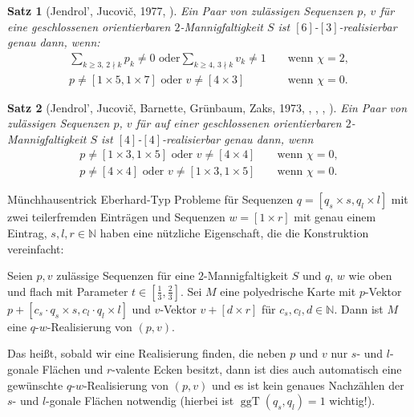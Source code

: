 \documentclass[10pt, notheorems]{beamer}
\newtheorem{theorem}{Satz}[section]
\newcommand{\nats}{\mathbb{N}}
\renewcommand{\gcd}{\operatorname{ggT}}
\begin{document}
\begin{frame}
  \begin{theorem}[{\sc Jendrol', Jucovi{\v{c}}}, 1977, \cite{jendrol1977generalization}] \label{thm:eberhard:extended:3}
    Ein Paar von zulässigen Sequenzen $p$, $v$ für eine geschlossenen orientierbaren $2$-Mannigfaltigkeit $S$ ist $[6]$-$[3]$-realisierbar genau dann, wenn:
    \begin{align*}
      \sum_{k \geq 3,\,2 \nmid k} p_k \neq 0 \text{ oder} \sum_{k \geq 4,\,3 \nmid k} v_k \neq 1& &\text{ wenn } \chi = 2, \\
      p \neq [1 \times 5, 1 \times 7] \text{ oder } v \neq [4 \times 3]& &\text{ wenn } \chi = 0.
    \end{align*}
  \end{theorem}
  \pause
  \begin{theorem}[{\sc Jendrol', Jucovi{\v{c}}, Barnette, Grünbaum, Zaks}, 1973, \cite{jucovivc1973theorem}, \cite{barnette1971toroidal}, \cite{grunbaum1969planar}, \cite{zaks1971analogue}] \label{thm:eberhard:extended:4}
    Ein Paar von zulässigen Sequenzen $p$, $v$ für auf einer geschlossenen orientierbaren $2$-Mannigfaltigkeit $S$ ist $[4]$-$[4]$-realisierbar genau dann, wenn
    \begin{align*}
      p \neq [1 \times 3, 1 \times 5] \text{ oder } v \neq [4 \times 4]& &\text{ wenn } \chi = 0,\\
      p \neq [4 \times 4] \text{ oder } v \neq [1 \times 3, 1 \times 5]& &\text{ wenn } \chi = 0.
    \end{align*}
  \end{theorem}
\end{frame}


\begin{frame}{Münchhausentrick}{}
  {\sc Eberhard}-Typ Probleme für Sequenzen $q = [q_s \times s, q_l \times l]$ mit zwei teilerfremden Einträgen und Sequenzen $w = [1 \times r]$ mit genau einem Eintrag, $s, l, r \in \nats$ haben eine nützliche Eigenschaft, die die Konstruktion vereinfacht:
  \begin{lemma}
    Seien $p, v$ zulässige Sequenzen für eine $2$-Mannigfaltigkeit $S$ und $q$, $w$ wie oben und flach mit Parameter $t \in \left[\tfrac{1}{3}, \tfrac{2}{3}\right]$. Sei $M$ eine polyedrische Karte mit $p$-Vektor $p + [c_s \cdot q_s \times s, c_l \cdot q_l \times l]$ und $v$-Vektor $v + [d \times r]$ für $c_s, c_l, d \in \nats$. Dann ist $M$ eine $q$-$w$-Realisierung von $(p, v)$.
  \end{lemma}
  \pause
  Das heißt, sobald wir eine Realisierung finden, die neben $p$ und $v$ nur $s$- und $l$-gonale Flächen und $r$-valente Ecken besitzt, dann ist dies auch automatisch eine gewünschte $q$-$w$-Realisierung von $(p, v)$ und es ist kein genaues Nachzählen der \newline $s$- und $l$-gonale Flächen notwendig (hierbei ist $\gcd(q_s, q_l) = 1$ wichtig!).
\end{frame}
\end{document}
